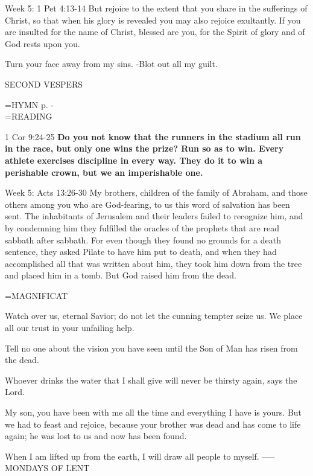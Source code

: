 Week 5:  1 Pet 4:13-14  But rejoice to the extent that you share in the sufferings of Christ, so that when his glory is revealed you may also rejoice exultantly. If you are insulted for the name of Christ, blessed are you, for the Spirit of glory and of God rests upon you.

Turn your face away from my sins.
-Blot out all my guilt.

\begin{flushleft}\normalsize SECOND VESPERS\\\end{flushleft}
\hangindent=\parindent \small{\uppercase{HYMN} p. \pageref{lent:firstHymn}-\pageref{lent:lastHymn}\\}
\hangindent=\parindent \small READING
\begin{description}[labelindent=\parindent, leftmargin=*]
\item [Week 1-4:]   1 Cor 9:24-25 \textbf{  Do you not know that the runners in the stadium all run in the race, but only one wins the prize? Run so as to win. Every athlete exercises discipline in every way. They do it to win a perishable crown, but we an imperishable one.\\}
\end{description}

Week 5:  Acts 13:26-30   My brothers, children of the family of Abraham, and those others among you who are God-fearing, to us this word of salvation has been sent. The inhabitants of Jerusalem and their leaders failed to recognize him, and by condemning him they fulfilled the oracles of the prophets that are read sabbath after sabbath. For even though they found no grounds for a death sentence, they asked Pilate to have him put to death, and when they had accomplished all that was written about him, they took him down from the tree and placed him in a tomb. But God raised him from the dead.

\hangindent=\parindent \small MAGNIFICAT
\begin{description}[labelindent=\parindent, leftmargin=*]
\item [Week 1:] 	Watch over us, eternal Savior; do not let the cunning tempter seize us. We place all our trust in your unfailing help.
\item [Week 2:] 	Tell no one about the vision you have seen until the Son of Man has risen from the dead.
\item [Week 3:] 	Whoever drinks the water that I shall give will never be thirsty again, says the Lord.
\item [Week 4:] 	My son, you have been with me all the time and everything I have is yours. But we had to feast and rejoice, because your brother was dead and has come to life again; he was lost to us and now has been found.
\item [Week 5:] 	When I am lifted up from the earth, I will draw all people to myself.
-----
MONDAYS OF LENT
\end{description}

